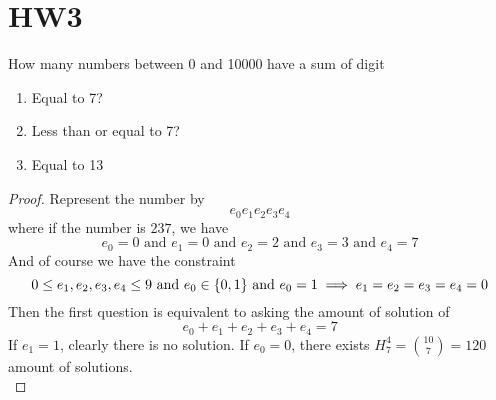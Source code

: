 \documentclass{report}
\begin{document}
\section{HW3}
\begin{question}{}{}
How many numbers between 0 and 10000 have a sum of digit
\begin{enumerate}[label=(\alph*)]
  \item Equal to 7?\\
  \item Less than or equal to 7?\\
  \item Equal to 13
\end{enumerate}
\end{question}
\begin{proof}
Represent the number by 
\begin{equation*}
e_0e_1e_2e_3e_4
\end{equation*}
where if the number is $237$, we have
 \begin{equation*}
e_0=0\text{ and }e_1=0\text{ and }e_2=2\text{ and }e_3=3\text{ and }e_4=7
\end{equation*}
And of course we have the constraint
\begin{equation*}
0\leq e_1,e_2,e_3,e_4\leq 9\text{ and }e_0\in \{ 0,1 \}\text{ and }e_0=1\implies e_1=e_2=e_3=e_4=0
\end{equation*}
Then the first question is equivalent to asking the amount of solution of 
\begin{equation*}
e_0+e_1+e_2+e_3+e_4=7
\end{equation*}
If $e_1=1$, clearly there is no solution. If  $e_0=0$, there exists $H^4_7=\binom{10}{7}=120$ amount of solutions.\\


\end{proof}
\end{document}
